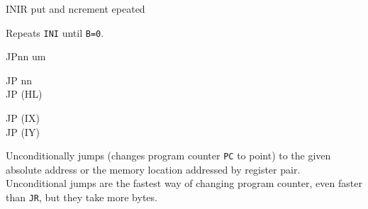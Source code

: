 \begin{basedescript}{
	\desclabelstyle{\multilinelabel}
	\desclabelwidth{3cm}}
	\begin{DetailItem}{INIR}{}
		{put and ncrement epeated}
		{\SymINIR}

		Repeats {\tt INI} until {\tt B=0}.

		\begin{DetailEffects}
			\FlagsINIR
		\end{DetailEffects}

		\begin{DetailEffectsFlags}
		\end{DetailEffectsFlags}

		\begin{DetailTiming}
		\end{DetailTiming}

	\end{DetailItem}

	\pagebreak


	\begin{DetailItem}{JP}{nn}
		{um}
		{}

		\begin{DetailVariants}
			JP nn\\
			JP (HL)
			
			\columnbreak
			JP (IX)\\
			JP (IY)
		\end{DetailVariants}

		Unconditionally jumps (changes program counter {\tt PC} to point) to the given absolute address or the memory location addressed by register pair. Unconditional jumps are the fastest way of changing program counter, even faster than {\tt JR}, but they take more bytes.


\end{DetailItem}
\end{basedescript}
